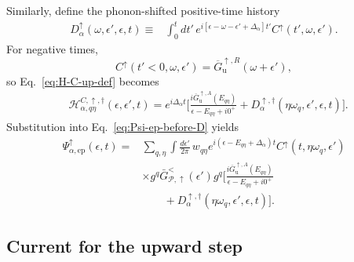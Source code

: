 \documentclass[
 reprint,
 superscriptaddress,
 amsmath,amssymb,
 aps,prb,
 longbibliography,
 floatfix
]{revtex4-2}
\newcommand{\ep}{\mathrm{ep}}
\begin{document}
Similarly, define the phonon-shifted positive-time history
\begin{equation*}
\begin{aligned}
D_\alpha^\uparrow
(\omega,\epsilon',\epsilon,t)
\equiv{}&
\int_0^t dt'\,
e^{i[
\epsilon-\omega-\epsilon'
+\Delta_\alpha]t'}
C^\uparrow(t',\omega,\epsilon').
\end{aligned}
\end{equation*}
For negative times,
\begin{equation*}
C^\uparrow(t'<0,\omega,\epsilon')
=
\overline G_{\mathrm u}^{\uparrow,R}
(\omega+\epsilon'),
\end{equation*}
so Eq.~\eqref{eq:H-C-up-def} becomes
\begin{align*}
&\mathcal H_{\alpha,q\eta}^{C,\uparrow,\dagger}
(\epsilon,\epsilon',t)
=
e^{i\Delta_\alpha t}
\Bigg[
\frac{
i\overline G_{\mathrm u}^{\uparrow,A}(E_{q\eta})}
{\epsilon-E_{q\eta}+i0^+}
+
D_\alpha^{\uparrow,\dagger}
(\eta\omega_q,\epsilon',\epsilon,t)
\Bigg].
\end{align*}
Substitution into Eq.~\eqref{eq:Psi-ep-before-D} yields
\begin{equation}
\boxed{
\begin{aligned}
\Psi_{\alpha,\ep}^\uparrow(\epsilon,t)
={}&
\sum_{q,\eta}
\int\frac{d\epsilon'}{2\pi}\,
w_{q\eta}
e^{i(
\epsilon-E_{q\eta}
+\Delta_\alpha)t}
C^\uparrow(t,\eta\omega_q,\epsilon')
\\
&\times
g^q
\bar G_{\mathcal P,\uparrow}^{<}(\epsilon')
g^q
\Bigg[
\frac{
i\overline G_{\mathrm u}^{\uparrow,A}(E_{q\eta})}
{\epsilon-E_{q\eta}+i0^+}
\\
&\qquad+
D_\alpha^{\uparrow,\dagger}
(\eta\omega_q,\epsilon',\epsilon,t)
\Bigg].
\end{aligned}}
\label{eq:Psi-ep-up-proof}
\end{equation}

\subsection{Current for the upward step}
\label{sec:up-current}
\end{document}
